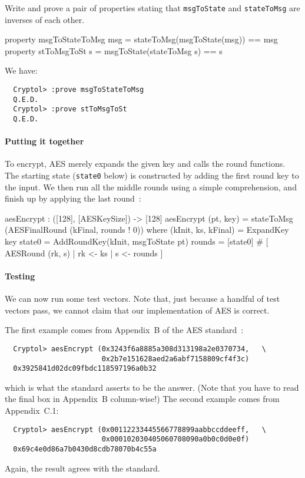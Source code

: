 \begin{Exercise}\label{ex:aes:enc0}
  Write and prove a pair of properties stating that {\tt msgToState}
  and {\tt stateToMsg} are inverses of each other.
\end{Exercise}
\begin{Answer}
\begin{code}
  property msgToStateToMsg msg = stateToMsg(msgToState(msg)) == msg
  property stToMsgToSt s = msgToState(stateToMsg s) == s
\end{code}
We have:
\begin{Verbatim}
  Cryptol> :prove msgToStateToMsg
  Q.E.D.
  Cryptol> :prove stToMsgToSt
  Q.E.D.
\end{Verbatim}
\end{Answer}

\paragraph*{Putting it together} To encrypt, AES merely expands the
given key and calls the round functions. The starting state (\texttt{state0}
below) is constructed by adding the first round key to the
input. We then run all the middle rounds using a simple comprehension,
and finish up by applying the last round~\cite[figure 5, section
5.1]{aes}:\indRIndex
\begin{code}
  aesEncrypt : ([128], [AESKeySize]) -> [128]
  aesEncrypt (pt, key) = stateToMsg (AESFinalRound (kFinal, rounds ! 0))
    where   (kInit, ks, kFinal) = ExpandKey key
            state0 = AddRoundKey(kInit, msgToState pt)
            rounds = [state0] # [ AESRound (rk, s) | rk <- ks
                                                   | s <- rounds
                                ]
\end{code}

\paragraph*{Testing} We can now run some test vectors. Note that, just
because a handful of test vectors pass, we cannot claim that our
implementation of AES is correct.

The first example comes from Appendix~B of the AES\indAES
standard~\cite{aes}:
\begin{Verbatim}
  Cryptol> aesEncrypt (0x3243f6a8885a308d313198a2e0370734,   \
                       0x2b7e151628aed2a6abf7158809cf4f3c)
  0x3925841d02dc09fbdc118597196a0b32
\end{Verbatim}
which is what the standard asserts to be the answer. (Note that you
have to read the final box in Appendix~B column-wise!)  The second
example comes from Appendix~C.1:
\begin{Verbatim}
  Cryptol> aesEncrypt (0x00112233445566778899aabbccddeeff,   \
                       0x000102030405060708090a0b0c0d0e0f)
  0x69c4e0d86a7b0430d8cdb78070b4c55a
\end{Verbatim}
Again, the result agrees with the standard.

